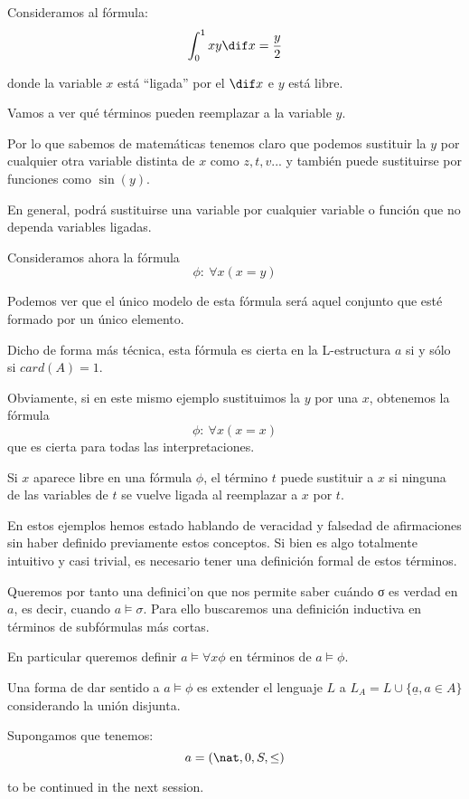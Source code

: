 \begin{example}

Consideramos al fórmula:
\[\int_0^1 xy \dif x = \frac{y}{2}\]

donde la variable $x$ está ``ligada'' por el $\dif x$ e $y$ está libre.

Vamos a ver qué términos pueden reemplazar a la variable $y$.

Por lo que sabemos de matemáticas tenemos claro que podemos sustituir la $y$ por cualquier otra variable distinta de $x$ como $z,t,v...$ y también puede sustituirse por funciones como $\sin(y)$.

En general, podrá sustituirse una variable por cualquier variable o función que no dependa variables ligadas.
\end{example}

\begin{example}
Consideramos ahora la fórmula
\[\phi: \ \forall x (x=y)\]

Podemos ver que el único modelo de esta fórmula será aquel conjunto que esté formado por un único elemento.

Dicho de forma más técnica, esta fórmula es cierta en la L-estructura $a$ si y sólo si $card(A)=1$.

Obviamente, si en este mismo ejemplo sustituimos la $y$ por una $x$, obtenemos la fórmula
\[\phi: \ \forall x (x=x)\]
que es cierta para todas las interpretaciones.
\end{example}

\begin{prop}
Si $x$ aparece libre en una fórmula $\phi$, el término $t$ puede sustituir a $x$ si ninguna de las variables de $t$ se vuelve ligada al reemplazar a $x$ por $t$.
\end{prop}

En estos ejemplos hemos estado hablando de veracidad y falsedad de afirmaciones sin haber definido previamente estos conceptos. Si bien es algo totalmente intuitivo y casi trivial, es necesario tener una definición formal de estos términos. 

Queremos por tanto una definici'on que nos permite saber cuándo σ es verdad en $a$, es decir, cuando $a\vDash σ$. Para ello buscaremos una definición inductiva en términos de subfórmulas más cortas.

En particular queremos definir $a \vDash \forall x \phi$ en términos de $a \vDash \phi$.

Una forma de dar sentido a $a\vDash \phi$ es extender el lenguaje $L$ a  $L_A=L\cup\{\underline{a}, a \in A\}$ considerando la unión disjunta.

\begin{example}
Supongamos que tenemos:
\[a = (\nat, 0,S, \leq)\]

to be continued in the next session.

\end{example}